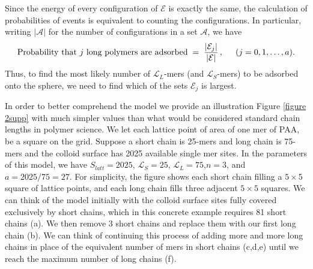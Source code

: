 \documentclass[journal=mamobx,manuscript=article]{achemso}
\newcommand{\leng}{\mathcal{L}}
\begin{document}
Since the energy of every configuration of $\mathcal{E}$ is exactly the same,
the calculation of probabilities of events is equivalent to counting the configurations.
In particular, writing $|\mathcal{A}|$ for the number of configurations in a set $\mathcal{A}$, we have
\[
    \hbox{Probability that $j$ long polymers are adsorbed}  \;=\; 
    \frac{|\mathcal{E}_j|}{|\mathcal{E}|}\,,   \hspace{5mm}(j=0,1,\ldots,a).
\]
Thus, to find the most likely number of $\leng_L$-mers (and $\leng_S$-mers) to be adsorbed onto the sphere,
we need to find which of the sets $\mathcal{E}_j$ is largest.


In order to better comprehend the model we provide an illustration Figure \ref{figure 2supp} with much simpler values than what would be considered standard chain lengths in polymer science. We let each lattice point of area of one mer of PAA, be a square on the grid. 
Suppose a short chain is %
25-mers and long chain is 75-mers and the colloid surface has 2025 available single mer sites.
In the parameters of this model, we have 
$S_{latt}=2025$, $\leng_S=25$,
$\leng_L=75$,$n=3$, and $a=2025/75=27$.
For simplicity, the figure shows each short chain
filling a $5\times 5$ square of lattice points, and each
long chain fills three adjacent $5\times 5$ squares.
We can think of the model initially with the colloid surface sites fully covered exclusively by short chains, which in this concrete example requires 81 short chains (a). We then remove 3 short chains and replace them with our first long chain (b). 
We can think of continuing this process of adding more and more long chains in place of the equivalent number of mers in short chains (c,d,e) until we reach the maximum number of long chains (f).
\end{document}
